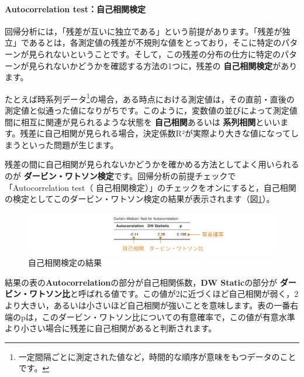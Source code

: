 \documentclass[
  12pt,
  a5jpaper,
  lualatex, ja=standard]{bxjsbook}
\renewcommand{\emph}[1]{\textbf{\color{emph} #1}}
\begin{document}
\hypertarget{autocorrelation-testux81eaux5df1ux76f8ux95a2ux691cux5b9a}{%
\paragraph*{Autocorrelation test：自己相関検定}\label{autocorrelation-testux81eaux5df1ux76f8ux95a2ux691cux5b9a}}

回帰分析には，「残差が互いに独立である」という前提があります。「残差が独立」であるとは，各測定値の残差が不規則な値をとっており，そこに特定のパターンが見られないということです。そして，この残差の分布の仕方に特定のパターンが見られないかどうかを確認する方法の1つに，残差の\emph{自己相関検定}があります。

たとえば時系列データ\footnote{一定間隔ごとに測定された値など，時間的な順序が意味をもつデータのことです。}の場合，ある時点における測定値は，その直前・直後の測定値と似通った値になりがちです。このように，変数値の並びによって測定値間に相互に関連が見られるような状態を\emph{自己相関}あるいは\emph{系列相関}といいます。残差に自己相関が見られる場合，決定係数R²が実際より大きな値になってしまうといった問題が生じます。

残差の間に自己相関が見られないかどうかを確かめる方法としてよく用いられるのが\emph{ダービン・ワトソン検定}です。回帰分析の前提チェックで「Autocorrelation test（ 自己相関検定）」のチェックをオンにすると，自己相関の検定としてこのダービン・ワトソン検定の結果が表示されます（図\ref{fig:regression-lr-assumption-dw}）。

\begin{figure}[!ht]

{\centering \includegraphics[width=1\linewidth]{images/regression/lr-assumption-dw} 

}

\caption{自己相関検定の結果}\label{fig:regression-lr-assumption-dw}
\end{figure}

結果の表の\textbf{Autocorrelation}の部分が自己相関係数，\textbf{DW Static}の部分が\emph{ダービン・ワトソン比}と呼ばれる値です。この値が2に近づくほど自己相関が弱く，2より大きい，あるいは小さいほど自己相関が強いことを意味します。表の一番右端のpは，このダービン・ワトソン比についての有意確率で，この値が有意水準より小さい場合に残差に自己相関があると判断されます。
\end{document}
